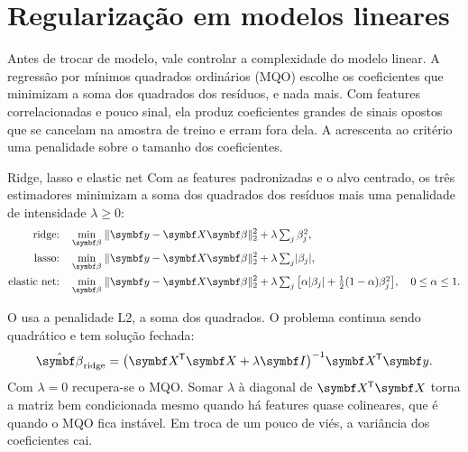 \section{Regularização em modelos lineares}
\label{sec:c13-regul}

Antes de trocar de modelo, vale controlar a complexidade do modelo linear. A regressão por mínimos quadrados ordinários (MQO) escolhe os coeficientes que minimizam a soma dos quadrados dos resíduos, e nada mais. Com features correlacionadas e pouco sinal, ela produz coeficientes grandes de sinais opostos que se cancelam na amostra de treino e erram fora dela. A  acrescenta ao critério uma penalidade sobre o tamanho dos coeficientes.

\begin{definicao}{Ridge, lasso e elastic net}
Com as features padronizadas e o alvo centrado, os três estimadores minimizam a soma dos quadrados dos resíduos mais uma penalidade de intensidade $\lambda \ge 0$:
\begin{align}
  \text{ridge:}\quad & \min_{\vetor{\beta}}\; \lVert \vetor{y} - \vetor{X}\vetor{\beta} \rVert_2^2 + \lambda \textstyle\sum_j \beta_j^2 , \label{eq:c13-ridge}\\
  \text{lasso:}\quad & \min_{\vetor{\beta}}\; \lVert \vetor{y} - \vetor{X}\vetor{\beta} \rVert_2^2 + \lambda \textstyle\sum_j \lvert\beta_j\rvert , \label{eq:c13-lasso}\\
  \text{elastic net:}\quad & \min_{\vetor{\beta}}\; \lVert \vetor{y} - \vetor{X}\vetor{\beta} \rVert_2^2 + \lambda \textstyle\sum_j \big[\alpha \lvert\beta_j\rvert + \tfrac{1}{2}(1-\alpha)\beta_j^2\big] , \quad 0 \le \alpha \le 1 . \nonumber
\end{align}
\end{definicao}

O  \citep{hoerl1970} usa a penalidade L2, a soma dos quadrados. O problema continua sendo quadrático e tem solução fechada:
\begin{equation}
  \hat{\vetor{\beta}}_{\text{ridge}} = \big(\vetor{X}\T\vetor{X} + \lambda \vetor{I}\big)^{-1} \vetor{X}\T \vetor{y} .
  \label{eq:c13-ridge-sol}
\end{equation}
Com $\lambda = 0$ recupera-se o MQO. Somar $\lambda$ à diagonal de $\vetor{X}\T\vetor{X}$ torna a matriz bem condicionada mesmo quando há features quase colineares, que é quando o MQO fica instável. Em troca de um pouco de viés, a variância dos coeficientes cai.

